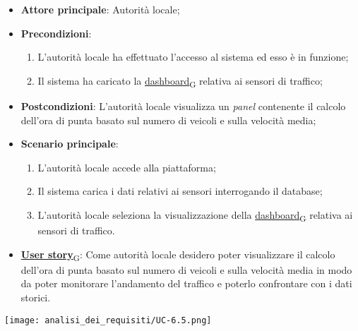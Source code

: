 \begin{itemize}
	\item \textbf{Attore principale}: Autorità locale;
	\item \textbf{Precondizioni}:
	      \begin{enumerate}
		      \item L'autorità locale ha effettuato l'accesso al sistema ed esso è in funzione;
		      \item Il sistema ha caricato la \href{https://7last.github.io/docs/rtb/documentazione-interna/glossario\#dashboard}{dashboard\textsubscript{G}} relativa ai sensori di traffico;
	      \end{enumerate}
	\item \textbf{Postcondizioni}: L'autorità locale visualizza un \textit{panel} contenente il calcolo dell'ora di punta basato sul numero di veicoli e sulla velocità media;
	\item \textbf{Scenario principale}:
	      \begin{enumerate}
		      \item L'autorità locale accede alla piattaforma;
		      \item Il sistema carica i dati relativi ai sensori interrogando il database;
		      \item L'autorità locale seleziona la visualizzazione della \href{https://7last.github.io/docs/rtb/documentazione-interna/glossario\#dashboard}{dashboard\textsubscript{G}} relativa ai sensori di traffico.
	      \end{enumerate}
	\item \href{https://7last.github.io/docs/rtb/documentazione-interna/glossario\#user-story}{\textbf{User story}\textsubscript{G}}:
	      Come autorità locale desidero poter visualizzare il calcolo dell'ora di punta basato sul numero di veicoli e sulla velocità media in modo da poter monitorare
	      l'andamento del traffico e poterlo confrontare con i dati storici.
\end{itemize}
\begin{center}
	\texttt{[image: analisi\_dei\_requisiti/UC-6.5.png]}
\end{center}


